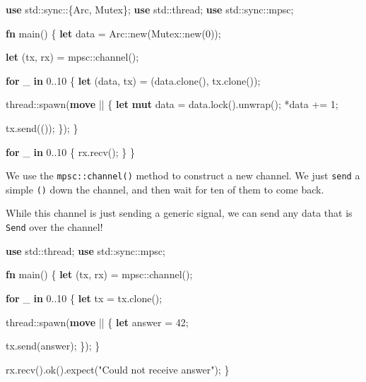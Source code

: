 \documentclass[a4paper,]{book}
\newenvironment{Shaded}{\begin{snugshade}}{\end{snugshade}}
\newcommand{\KeywordTok}[1]{\textcolor[rgb]{0.13,0.29,0.53}{\textbf{{#1}}}}
\newcommand{\DecValTok}[1]{\textcolor[rgb]{0.00,0.00,0.81}{{#1}}}
\newcommand{\StringTok}[1]{\textcolor[rgb]{0.31,0.60,0.02}{{#1}}}
\newcommand{\NormalTok}[1]{{#1}}
\begin{document}
\begin{Shaded}
\begin{Highlighting}[]
\KeywordTok{use} \NormalTok{std::sync::\{Arc, Mutex\};}
\KeywordTok{use} \NormalTok{std::thread;}
\KeywordTok{use} \NormalTok{std::sync::mpsc;}

\KeywordTok{fn} \NormalTok{main() \{}
    \KeywordTok{let} \NormalTok{data = Arc::new(Mutex::new(}\DecValTok{0}\NormalTok{));}

    \KeywordTok{let} \NormalTok{(tx, rx) = mpsc::channel();}

    \KeywordTok{for} \NormalTok{_ }\KeywordTok{in} \DecValTok{0.}\NormalTok{.}\DecValTok{10} \NormalTok{\{}
        \KeywordTok{let} \NormalTok{(data, tx) = (data.clone(), tx.clone());}

        \NormalTok{thread::spawn(}\KeywordTok{move} \NormalTok{|| \{}
            \KeywordTok{let} \KeywordTok{mut} \NormalTok{data = data.lock().unwrap();}
            \NormalTok{*data += }\DecValTok{1}\NormalTok{;}

            \NormalTok{tx.send(());}
        \NormalTok{\});}
    \NormalTok{\}}

    \KeywordTok{for} \NormalTok{_ }\KeywordTok{in} \DecValTok{0.}\NormalTok{.}\DecValTok{10} \NormalTok{\{}
        \NormalTok{rx.recv();}
    \NormalTok{\}}
\NormalTok{\}}
\end{Highlighting}
\end{Shaded}

We use the \texttt{mpsc::channel()} method to construct a new channel.
We just \texttt{send} a simple \texttt{()} down the channel, and then
wait for ten of them to come back.

While this channel is just sending a generic signal, we can send any
data that is \texttt{Send} over the channel!

\begin{Shaded}
\begin{Highlighting}[]
\KeywordTok{use} \NormalTok{std::thread;}
\KeywordTok{use} \NormalTok{std::sync::mpsc;}

\KeywordTok{fn} \NormalTok{main() \{}
    \KeywordTok{let} \NormalTok{(tx, rx) = mpsc::channel();}

    \KeywordTok{for} \NormalTok{_ }\KeywordTok{in} \DecValTok{0.}\NormalTok{.}\DecValTok{10} \NormalTok{\{}
        \KeywordTok{let} \NormalTok{tx = tx.clone();}

        \NormalTok{thread::spawn(}\KeywordTok{move} \NormalTok{|| \{}
            \KeywordTok{let} \NormalTok{answer = }\DecValTok{42}\NormalTok{;}

            \NormalTok{tx.send(answer);}
        \NormalTok{\});}
    \NormalTok{\}}

   \NormalTok{rx.recv().ok().expect(}\StringTok{"Could not receive answer"}\NormalTok{);}
\NormalTok{\}}
\end{Highlighting}
\end{Shaded}
\end{document}
